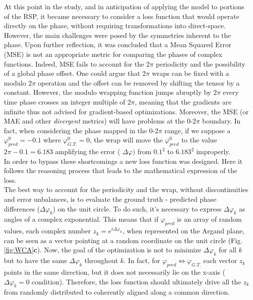 At this point in the study, and in anticipation of applying the model to portions of the RSP, it became necessary to 
consider a loss function that would operate directly on the phase, without requiring transformations into direct-space. 
However, the main challenges were posed by the symmetries inherent to the phase. Upon further reflection, it was concluded
that a Mean Squared Error (MSE) is not an appropriate metric for comparing the phases of complex functions. Indeed, MSE 
fails to account for the 2$\pi$ periodicity and the possibility of a global phase offset. One could argue that 2$\pi$ wraps 
can be fixed with a modulo 2$\pi$ operation and the offset can be removed by shifting the tensor by a constant. However, 
the modulo wrapping function jumps abruptly by 2$\pi$ every time phase crosses an integer multiple of 2$\pi$, meaning that 
the gradients are infinite thus not advised for gradient-based optimizations. Moreover, the MSE (or MAE and other 
\textit{divergent} metrics) will have problems at the 0-2$\pi$ boundary. In fact, when considering the phase mapped in the
0-2$\pi$ range, if we suppose a $\varphi_{pred}^0 = -0.1$ where $\varphi_{G.T.}^0 = 0$, the wrap will move the $\varphi_{pred}^0$ to the value 
$2\pi - 0.1 = 6.183$ amplifying the error ( $\Delta\varphi)$ from $0.1^2$ to $6.183^2$ improperly.\\

In order to bypass these shortcomings a new loss function was designed. Here it follows the reasoning process that leads
to the mathematical expression of the loss.  \\
The best way to account for the periodicity and the wrap, without discontinuities 
and error unbalances, is to evaluate the ground truth - predicted phase differences ($\Delta\varphi_k$) on the unit circle. 
To do such, it's necessary to express $\Delta\varphi_k$ as angles of a complex exponential. This means that if $\varphi_{pred}$ is an array of 
random values, each complex number $ z_k = e^{i\Delta\varphi_k}$, when represented on the Argand plane, can be seen as a 
vector pointing at a random coordinate on the unit circle (Fig. \ref{fig:WCA}\textbf{c}). Now, the goal of the optimization is not to minimize $\Delta\varphi_k$ 
for all $k$ but to have the same $\Delta\varphi_k$ throughout $k$. In fact, for $\varphi_{pred} \Leftrightarrow \varphi_{G.T.}$ each 
vector $z_k$ points in the same direction, but it does not necessarily lie on the x-axis ($\Delta\varphi_k = 0 $ condition). 
Therefore, the loss function should ultimately drive all the $z_k$ from randomly distributed to coherently aligned along a common 
direction. 

